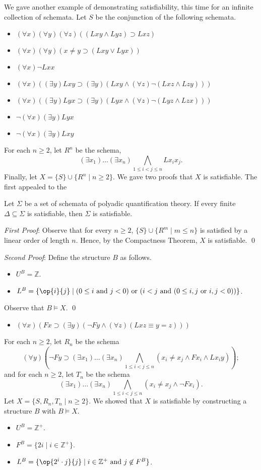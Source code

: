 We gave another example of demonstrating satisfiability, this time for an infinite collection of schemata. Let $S$ be the conjunction of the following schemata.
\begin{itemize}
\item 
$(\forall x)(\forall y)(\forall z)((Lxy \wedge Lyz) \supset Lxz)$
\item
$(\forall x)(\forall y)(x\neq y\supset(Lxy \vee Lyx))$
\item
$(\forall x) \neg Lxx$
\item 
$(\forall x)((\exists y)Lxy\supset(\exists y)(Lxy\wedge (\forall z)\neg (Lxz\wedge Lzy)))$
\item 
$(\forall x)((\exists y)Lyx\supset(\exists y)(Lyx\wedge (\forall z)\neg (Lyz\wedge Lzx)))$
\item
$\neg(\forall x)(\exists y)Lyx$
\item
$\neg(\forall x)(\exists y)Lxy$
\end{itemize}
For each $n\geq 2$, let $R^n$ be the schema, 
\[
(\exists x_1)\ldots(\exists x_n)\bigwedge_{1\leq i< j\leq n}Lx_ix_j.
\]
Finally, let $X=\{S\}\cup\{R^n\mid n\geq 2\}$. We gave two proofs that $X$ is satisfiable. The first appealed to the 
\begin{theorem}
Let $\Sigma$ be a set of schemata of polyadic quantification theory. If every finite $\Delta\subseteq\Sigma$ is satisfiable, then $\Sigma$ is satisfiable.
\end{theorem}

\emph{First Proof}:
Observe that for every $n\geq 2$, $\{S\}\cup \{R^m\mid m\leq n\}$ is satisfied by a linear order of length $n$. Hence, by the Compactness Theorem, $X$ is satisfiable. \qed

\emph{Second Proof}: Define the structure $B$ as follows.
\begin{itemize}
\item
$U^B=  \mathbb{Z}$.
\item
$L^B=\{\op{i}{j}\mid (0\leq i\mbox{ and } j<0)\mbox{ or }(i<j \mbox{ and }  (0\leq i,j\mbox{ or } i,j<0))\}$.
\end{itemize}
Observe that $B\models X$. \qed

\begin{itemize}
\item $(\forall x)(Fx\supset(\exists y)(\neg Fy\wedge(\forall z)(Lxz\equiv y=z)))$
\end{itemize}
For each $n\geq 2$, let $R_n$ be the schema
\[
(\forall y)(\neg Fy\supset(\exists x_1)\ldots(\exists x_n)\bigwedge_{1\leq i<j\leq n}(x_i\neq x_j\wedge Fx_i\wedge Lx_iy));
\]
and for each $n\geq 2$, let $T_n$ be the schema
\[
(\exists x_1)\ldots(\exists x_n)\bigwedge_{1\leq i<j\leq n}(x_i\neq x_j\wedge \neg Fx_i).
\]
Let $X=\{S,R_n,T_n\mid n\geq 2\}$. We showed that $X$ is satisfiable by constructing a structure $B$ with $B\models X$.
\begin{itemize}
\item
$U^B= \mathbb{Z}^+$.
\item
$F^B=\{2i\mid i\in\mathbb{Z}^+\}$.
\item
$L^B = \{\op{2^i\cdot j}{j}\mid i\in\mathbb{Z}^+\mbox{ and } j\not\in F^B\}$.
\end{itemize}
